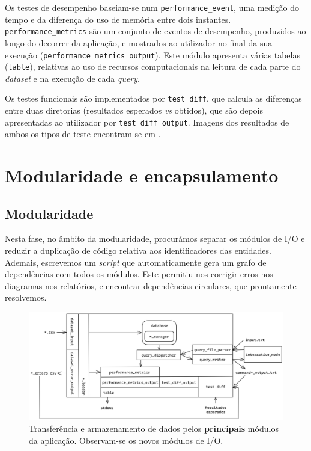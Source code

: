 \documentclass[11pt, a4paper]{article}
\begin{document}
Os testes de desempenho baseiam-se num \texttt{performance\_event}, uma medição do tempo e da
diferença do uso de memória entre dois instantes. \texttt{performance\_metrics} são um conjunto de
eventos de desempenho, produzidos ao longo do decorrer da aplicação, e mostrados ao utilizador no
final da sua execução (\texttt{performance\_metrics\_output}). Este módulo apresenta várias tabelas
(\texttt{table}), relativas ao uso de recursos computacionais na leitura de cada parte do
\emph{dataset} e na execução de cada \emph{query}.

Os testes funcionais são implementados por \texttt{test\_diff}, que calcula as diferenças entre
duas diretorias (resultados esperados \emph{vs} obtidos), que são depois apresentadas ao utilizador
por \texttt{test\_diff\_output}. Imagens dos resultados de ambos os tipos de teste encontram-se
em .

\section{Modularidade e encapsulamento}
\label{sec:modularity-and-encapsulation}

\subsection{Modularidade}
\label{sec:modularity}

Nesta fase, no âmbito da modularidade, procurámos separar os módulos de I/O e reduzir a duplicação
de código relativa aos identificadores das entidades. Ademais, escrevemos um \emph{script} que
automaticamente gera um grafo de dependências com todos os módulos. Este permitiu-nos corrigir erros
nos diagramas nos relatórios, e encontrar dependências circulares, que prontamente resolvemos.

\begin{figure}[ht]
    \centering
    \includegraphics[scale=0.115]{res-fase2/io.png}
    \caption{Transferência e armazenamento de dados pelos \textbf{principais} módulos da aplicação.
             Observam-se os novos módulos de I/O.}
    \label{fig:io}
\end{figure}
\end{document}
